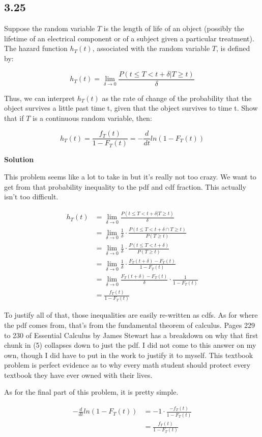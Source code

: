 \subsection*{3.25}

Suppose the random variable $T$ is the length of life of an object (possibly the lifetime of an electrical component or of a subject given a particular treatment). The hazard function $h_T(t)$, associated with the random variable $T$, is defined by:

\[
	h_T(t) = \lim_{\delta \to 0} \frac{P\left( t \leq T < t + \delta | T \geq t \right)}{\delta}
\]

Thus, we can interpret $h_T(t)$ as the rate of change of the probability that the object survives a little past time t, given that the object survives to time t. Show that if $T$ is a continuous random variable, then:

\[
	h_T(t) = \frac{f_T(t)}{1 - F_T(t)} = -\frac{d}{dt} ln(1 - F_T(t))
\]

\noindent \textbf{Solution}

This problem seems like a lot to take in but it's really not too crazy. We want to get from that probability inequality to the pdf and cdf fraction. This actually isn't too difficult.

\begin{align}
	h_T(t) &= \lim_{\delta \to 0} \frac{P\left( t \leq T < t + \delta | T \geq t \right)}{\delta} \\
	&= \lim_{\delta \to 0} \frac{1}{\delta} \cdot \frac{P\left( t \leq T < t + \delta \cap T \geq t \right)}{P(T \geq t)} \\
	&= \lim_{\delta \to 0} \frac{1}{\delta} \cdot \frac{P\left( t \leq T < t + \delta \right)}{P(T \geq t)} \\
	&= \lim_{\delta \to 0} \frac{1}{\delta} \cdot \frac{F_T(t + \delta) - F_T(t)}{1 - F_T(t)} \\
	&= \lim_{\delta \to 0} \frac{F_T(t + \delta) - F_T(t)}{\delta} \cdot \frac{1}{1 - F_T(t)} \\
	&= \frac{f_T(t)}{1 - F_T(t)}
\end{align}

To justify all of that, those inequalities are easily re-written as cdfs. As for where the pdf comes from, that's from the fundamental theorem of calculus. Pages 229 to 230 of Essential Calculus by James Stewart has a breakdown on why that first chunk in (5) collapses down to just the pdf. I did not come to this answer on my own, though I did have to put in the work to justify it to myself. This textbook problem is perfect evidence as to why every math student should protect every textbook they have ever owned with their lives.

\pagebreak

As for the final part of this problem, it is pretty simple. 

\begin{align*}
	- \frac{d}{dt} ln(1 - F_T(t)) &= -1 \cdot \frac{-f_T(t)}{1 - F_T(t)} \\
	&=  \frac{f_T(t)}{1 - F_T(t)} 
\end{align*}

